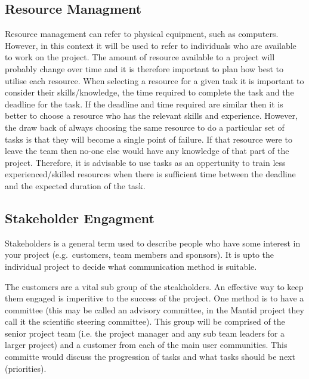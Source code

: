 \documentclass[jnr]{iosart2x}
\begin{document}
\subsection{Resource Managment}\label{rman}
Resource management can refer to physical equipment, such as computers.
However, in this context it will be used to refer to individuals who are available to work on the project.
The amount of resource available to a project will probably change over time and it is therefore important to plan how best to utilise each resource.
When selecting a resource for a given task it is important to consider their skills/knowledge, the time required to complete the task and the deadline for the task.
If the deadline and time required are similar then it is better to choose a resource who has the relevant skills and experience.
However, the draw back of always choosing the same resource to do a particular set of tasks is that they will become a single point of failure.
If that resource were to leave the team then no-one else would have any knowledge of that part of the project.
Therefore, it is advisable to use tasks as an oppertunity to train less experienced/skilled resources when there is sufficient time between the deadline and the expected duration of the task.

\subsection{Stakeholder Engagment}\label{se}
Stakeholders is a general term used to describe people who have some interest in your project (e.g.\ customers, team members and sponsors).
It is upto the individual project to decide what communication method is suitable.

The customers are a vital sub group of the steakholders.
An effective way to keep them engaged is imperitive to the success of the project.
One method is to have a committee (this may be called an advisory committee, in the Mantid project they call it the scientific steering committee).
This group will be comprised of the senior project team (i.e. the project manager and any sub team leaders for a larger project) and a customer from each of the main user communities.
This committe would discuss the progression of tasks and what tasks should be next (priorities).
\end{document}
